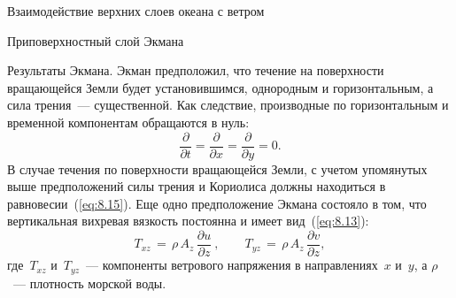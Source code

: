 \begin{chapter}{Взаимодействие верхних слоев океана с ветром}
\begin{section}{Приповерхностный слой Экмана}
\begin{paragraph}{Результаты Экмана.}
Экман предположил, что течение на
поверхности вращающейся Земли будет установившимся, однородным и 
горизонтальным, а сила трения~--- существенной. Как следствие,
производные по горизонтальным и временной компонентам обращаются в нуль:
\begin{equation}
 \frac{\partial}{\partial{t}}=\frac{\partial}{\partial{x}}=\frac{\partial}{\partial{y}}=0.
\end{equation}
В случае течения по поверхности вращающейся Земли, с учетом упомянутых выше 
предположений силы трения и Кориолиса должны находиться 
в равновесии~(\ref{eq:8.15}). Еще одно предположение Экмана состояло в том, 
что вертикальная вихревая вязкость постоянна и имеет вид~(\ref{eq:8.13}):
\begin{equation}\label{eq:9.7}
 T_{xz} \,=\,\rho\, A_z \,\frac{\partial{u}}{\partial{z}}\: , \qquad 
 T_{yz} \,=\,\rho\, A_z \,\frac{\partial{v}}{\partial{z}},
\end{equation}
где~$T_{xz}$ и~$T_{yz}$~--- компоненты ветрового напряжения
 в направлениях~$x$ и~$y$,
а $\rho$~--- плотность морской воды.
%


\end{paragraph}
\end{section}
\end{chapter}
